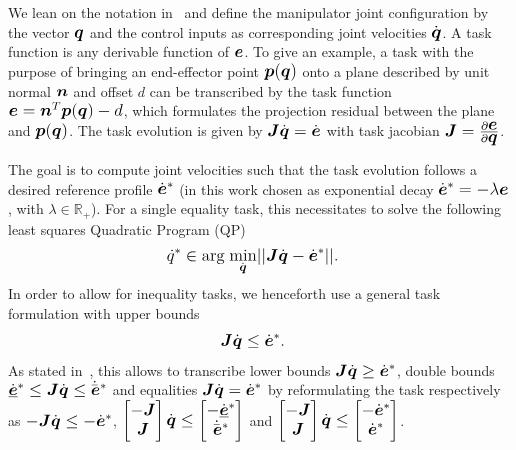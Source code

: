 We lean on the notation in~\cite{Esca14} and define the manipulator joint configuration by the
vector $\mbm{q}$ and the control inputs as corresponding joint velocities $\dot{\mbm{q}}$. A task
function is any derivable function of $\mbm{e}$. To give an example, a task with the purpose of
bringing an end-effector point $\mbm{p}(\mbm{q})$ onto a plane described by unit normal $\mbm{n}$
and offset $d$ can be transcribed by the task function $\mbm{e}=\mbm{n}^T\mbm{p}(\mbm{q})-d$, which
formulates the projection residual between the plane and $\mbm{p}(\mbm{q})$. The task evolution is
given by $\mbm{J}\dot{\mbm{q}}=\dot{\mbm{e}}$ with task jacobian
$\mbm{J}=\frac{\partial\mbm{e}}{\partial\mbm{q}}$.

The goal is to compute joint velocities such that the task evolution follows a desired reference
profile $\dot{\mbm{e}}^*$ (in this work chosen as exponential decay $\dot{\mbm{e}}^*= -\lambda
\mbm{e}$, with $\lambda \in \mathbb{R}_+$). For a single equality task, this necessitates to solve
the following least squares Quadratic Program (QP)
%
\begin{align}\label{eq:QP}
  \dot{q}^* &\in \mbox{arg} \; \underset{\footnotesize\dot{\mbm{q}}\normalsize}{\mbox{min}}||\mbm{J}\dot{\mbm{q}}-\dot{\mbm{e}}^*||.
\end{align}
%
In order to allow for inequality tasks, we henceforth use a general task formulation with upper
bounds 
\begin{align}\label{eq:task}
  \mbm{J}\dot{\mbm{q}}&\leq \dot{\mbm{e}}^*.
\end{align}
%
As stated in~\cite{Esca14}, this allows to transcribe lower bounds \mbox{$\mbm{J}\dot{\mbm{q}} \geq
  \dot{\mbm{e}}^*$,} double bounds \mbox{$\dot{\underline{\mbm{e}}}^* \leq \mbm{J}\dot{\mbm{q}} \leq
  \dot{\bar{\mbm{e}}}^*$} and equalities \mbox{$\mbm{J}\dot{\mbm{q}}=\dot{\mbm{e}}^*$} by
reformulating the task respectively as
\mbox{$-\mbm{J}\dot{\mbm{q}} \leq -\dot{\mbm{e}}^*$,} $\begin{bmatrix} -\mbm{J} \\
  \mbm{J} \end{bmatrix}\dot{\mbm{q}} \leq \begin{bmatrix} -\dot{\underline{\mbm{e}}}^*
  \\ \dot{\bar{\mbm{e}}}^* \end{bmatrix}$ and $\begin{bmatrix} -\mbm{J} \\
  \mbm{J} \end{bmatrix}\dot{\mbm{q}} \leq \begin{bmatrix} -\dot{\mbm{e}}^* \\
  \dot{\mbm{e}}^* \end{bmatrix}$.

